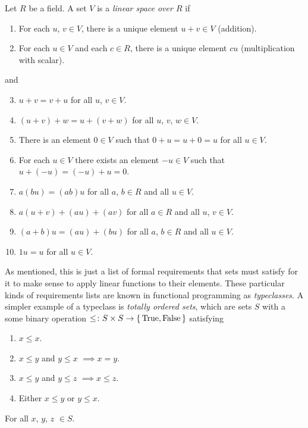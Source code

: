 \documentclass[english, 12pt]{article}
\begin{document}
\begin{definition}\label{def:linear_space}
	Let \(R\) be a field.
	A set \(V\) is a \emph{linear space over \(R\)} if
	\begin{enumerate}
		\item For each \(u\), \(v \in V\), there is a unique element \(u + v \in V\) (addition).
		\item For each \(u \in V\) and each \(c \in R\), there is a unique element \(c u\) (multiplication with scalar).
	\end{enumerate}
	and
	\begin{enumerate}
		\setcounter{enumi}{2}
		\item \(u + v = v + u\) for all \(u\), \(v \in V\).
		\item \((u + v) + w = u + (v + w)\) for all \(u\), \(v\), \(w \in V\).
		\item There is an element \(\mathit 0 \in V\) such that \(\mathit 0 + u = u + \mathit 0 = u\) for all \(u \in V\).
		\item For each \(u \in V\) there exists an element \(-u \in V\) such that \(u + (-u) = (-u) + u = \mathit 0\).
		\item \(a(b u) = (a b) u\) for all \(a\), \(b \in R\) and all \(u \in V\).
		\item \(a (u + v) + (a u) + (a v)\) for all \(a \in R\) and all \(u\), \(v \in V\).
		\item \((a + b) u = (a u) + (b u)\) for all \(a\), \(b \in R\) and all \(u \in V\).
		\item \(1 u = u\) for all \(u \in V\).
	\end{enumerate}
\end{definition}

As mentioned, this is just a list of formal requirements that sets must satisfy for it to make sense to apply linear functions to their elements.
These particular kinds of requirements lists are known in functional programming as \emph{typeclasses}.
A simpler example of a typeclass is \emph{totally ordered sets}, which are sets \(S\) with a some binary operation \(\leq \colon S \times S \to \set{\textrm{True}, \textrm{False}}\) satisfying
\begin{enumerate}
	\item \(x \leq x\).
	\item \(x \leq y\) and \(y \leq x\) \(\implies x = y\).
	\item \(x \leq y\) and \(y \leq z\) \(\implies x \leq z\).
	\item Either \(x \leq y\) or \(y \leq x\).
\end{enumerate}
For all \(x\), \(y\), \(z\) \(\in S\).
\end{document}
